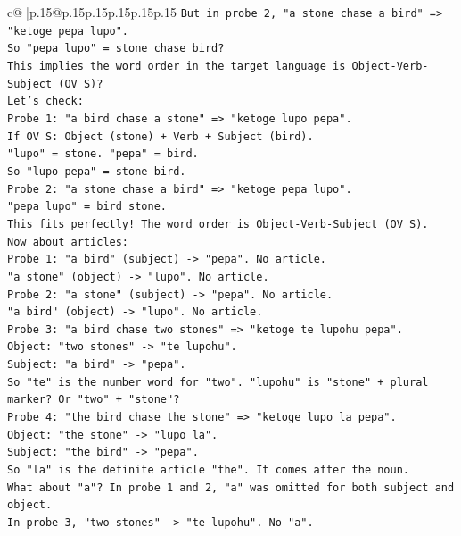 \documentclass{article}
\begin{document}
{\begin{supertabular}{c@{$\;$}|p{.15\linewidth}@{}p{.15\linewidth}p{.15\linewidth}p{.15\linewidth}p{.15\linewidth}p{.15\linewidth}}
{{{\texttt{But in probe 2, "a stone chase a bird" => "ketoge pepa lupo".} \\
\texttt{So "pepa lupo" = stone chase bird?} \\
\texttt{This implies the word order in the target language is Object{-}Verb{-}Subject (OV S)?} \\
\texttt{Let's check:} \\
\texttt{Probe 1: "a bird chase a stone" => "ketoge lupo pepa".} \\
\texttt{If OV S: Object (stone) + Verb + Subject (bird).} \\
\texttt{"lupo" = stone. "pepa" = bird.} \\
\texttt{So "lupo pepa" = stone bird.} \\
\texttt{Probe 2: "a stone chase a bird" => "ketoge pepa lupo".} \\
\texttt{"pepa lupo" = bird stone.} \\
\texttt{This fits perfectly! The word order is Object{-}Verb{-}Subject (OV S).} \\
\texttt{Now about articles:} \\
\texttt{Probe 1: "a bird" (subject) {-}> "pepa". No article.} \\
\texttt{"a stone" (object) {-}> "lupo". No article.} \\
\texttt{Probe 2: "a stone" (subject) {-}> "pepa". No article.} \\
\texttt{"a bird" (object) {-}> "lupo". No article.} \\
\texttt{Probe 3: "a bird chase two stones" => "ketoge te lupohu pepa".} \\
\texttt{Object: "two stones" {-}> "te lupohu".} \\
\texttt{Subject: "a bird" {-}> "pepa".} \\
\texttt{So "te" is the number word for "two". "lupohu" is "stone" + plural marker? Or "two" + "stone"?} \\
\texttt{Probe 4: "the bird chase the stone" => "ketoge lupo la pepa".} \\
\texttt{Object: "the stone" {-}> "lupo la".} \\
\texttt{Subject: "the bird" {-}> "pepa".} \\
\texttt{So "la" is the definite article "the". It comes after the noun.} \\
\texttt{What about "a"? In probe 1 and 2, "a" was omitted for both subject and object.} \\
\texttt{In probe 3, "two stones" {-}> "te lupohu". No "a".} \\
}}}
\end{supertabular}}
\end{document}
